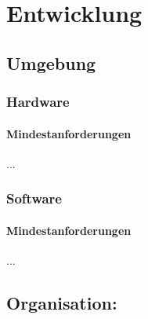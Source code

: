 %
%


\chapter{Entwicklung}
\label{Entwicklung}


\section{Umgebung}

\subsection{Hardware}

\subsubsection{Mindestanforderungen}

...
\\


\subsection{Software}

\subsubsection{Mindestanforderungen}

...
\\



\section{Organisation:}